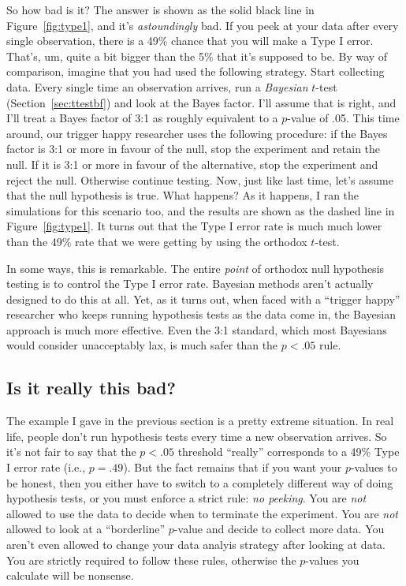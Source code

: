 So how bad is it? The answer is shown as the solid black line in Figure~\ref{fig:type1}, and it's {\it astoundingly} bad. If you peek at your data after every single observation, there is a 49\% chance that you will make a Type I error. That's, um, quite a bit bigger than the 5\% that it's supposed to be. By way of comparison, imagine that you had used the following strategy. Start collecting data. Every single time an observation arrives, run a {\it Bayesian} $t$-test (Section~\ref{sec:ttestbf}) and look at the Bayes factor. I'll assume that  is right, and I'll treat a Bayes factor of 3:1 as roughly equivalent to a $p$-value of .05. This time around, our trigger happy researcher uses the following procedure: if the Bayes factor is 3:1 or more in favour of the null, stop the experiment and retain the null. If it is 3:1 or more in favour of the alternative, stop the experiment and reject the null. Otherwise continue testing. Now, just like last time, let's assume that the null hypothesis is true. What happens? As it happens, I ran the simulations for this scenario too, and the results are shown as the dashed line in Figure~\ref{fig:type1}. It turns out that the Type I error rate is much much lower than the 49\% rate that we were getting by using the orthodox $t$-test.

In some ways, this is remarkable. The entire {\it point} of orthodox null hypothesis testing is to control the Type I error rate. Bayesian methods aren't actually designed to do this at all. Yet, as it turns out, when faced with a ``trigger happy'' researcher who keeps running hypothesis tests as the data come in, the Bayesian approach is much more effective. Even the 3:1 standard, which most Bayesians would consider unacceptably lax, is much safer than the $p<.05$ rule. 


\subsection{Is it really this bad?}

The example I gave in the previous section is a pretty extreme situation. In real life, people don't run hypothesis tests every time a new observation arrives. So it's not fair to say that the $p<.05$ threshold ``really'' corresponds to a 49\% Type I error rate (i.e., $p=.49$). But the fact remains that if you want your $p$-values to be honest, then you either have to switch to a completely different way of doing hypothesis tests, or you must enforce a strict rule: {\it no peeking}. You are {\it not} allowed to use the data to decide when to terminate the experiment. You are {\it not} allowed to look at a ``borderline'' $p$-value and decide to collect more data. You aren't even allowed to change your data analyis strategy after looking at data. You are strictly required to follow these rules, otherwise the $p$-values you calculate will be nonsense.

